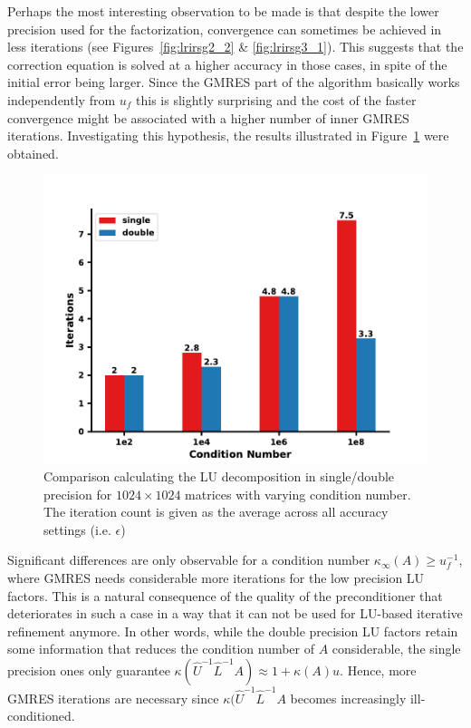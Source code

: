 Perhaps the most interesting observation to be made is that despite the lower precision used for the factorization, convergence can sometimes be achieved in less iterations (see Figures~\hyperref[fig:lrirsg2_2]{\ref{fig:lrirsg2_2}} \& \hyperref[fig:lrirsg3_1]{\ref{fig:lrirsg3_1}}). This suggests that the correction equation is solved at a higher accuracy in those cases, in spite of the initial error being larger. Since the GMRES part of the algorithm basically works independently from $u_f$ this is slightly surprising and the cost of the faster convergence might be associated with a higher number of inner GMRES iterations. Investigating this hypothesis, the results illustrated in Figure~\hyperref[fig:lr_irs_iter]{\ref{fig:lr_irs_iter}} were obtained.

\begin{figure}[h]
    \centering
    \includegraphics[width=0.7\linewidth]{chapters/5_experiments/figures/GMRES_iter.pdf}
    \caption[Mixed Precision Low-Rank IR - GMRES Iterations]{Comparison calculating the LU decomposition in single/double precision for $1024 \times 1024$ matrices with varying condition number. The iteration count is given as the average across all accuracy settings (i.e. $\epsilon$)}
    \label{fig:lr_irs_iter}
\end{figure}

Significant differences are only observable for a condition number $\kappa_\infty(A) \geq u_f^{-1}$, where GMRES needs considerable more iterations for the low precision LU factors. This is a natural consequence of the quality of the preconditioner that deteriorates in such a case in a way that it can not be used for LU-based iterative refinement anymore. In other words, while the double precision LU factors retain some information that reduces the condition number of $A$ considerable, the single precision ones only guarantee $ \kappa(\hat{U}^{-1}\hat{L}^{-1}A)\approx 1 + \kappa(A)u$. Hence, more GMRES iterations are necessary since $\kappa(\hat{U}^{-1}\hat{L}^{-1}A$ becomes increasingly ill-conditioned.

